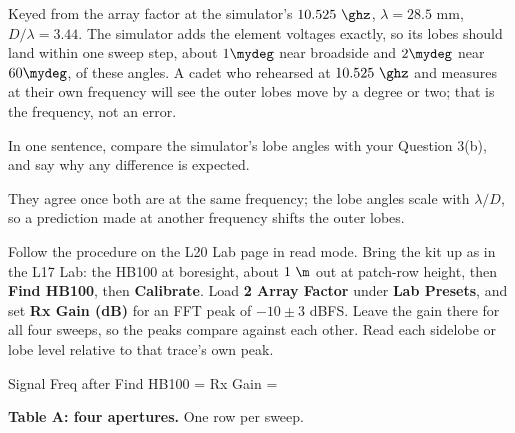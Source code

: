 \documentclass{exam}
\begin{document}
\begin{questions}
\begin{solution}
Keyed from the array factor at the simulator's $10.525\ \ghz$,
$\lambda = 28.5$ mm, $D/\lambda = 3.44$. The simulator adds the element voltages
exactly, so its lobes should land within one sweep step, about $1\mydeg$ near
broadside and $2\mydeg$ near $60\mydeg$, of these angles. A cadet who rehearsed
at $10.525\ \ghz$ and measures at their own frequency will see the outer lobes
move by a degree or two; that is the frequency, not an error.
\end{solution}

In one sentence, compare the simulator's lobe angles with your Question 3(b), and
say why any difference is expected.

\begin{solution}[0.9in]
They agree once both are at the same frequency; the lobe angles scale with
$\lambda/D$, so a prediction made at another frequency shifts the outer lobes.
\end{solution}

\newpage
{}

Follow the procedure on the L20 Lab page in read mode. Bring the kit up as in the
L17 Lab: the HB100 at boresight, about $1\ \m$ out at patch-row height, then
\textbf{Find HB100}, then \textbf{Calibrate}. Load \textbf{2 Array Factor} under
\textbf{Lab Presets}, and set \textbf{Rx Gain (dB)} for an FFT peak of
$-10 \pm 3$ dBFS. Leave the gain there for all four sweeps, so the peaks compare
against each other. Read each sidelobe or lobe level relative to that trace's own
peak.

\vspace{2pt}
\begin{center}
Signal Freq after Find HB100 =  \hspace{0.25in}
Rx Gain = 
\end{center}

\question \textbf{Table A: four apertures.} One row per sweep.


\end{questions}
\end{document}
